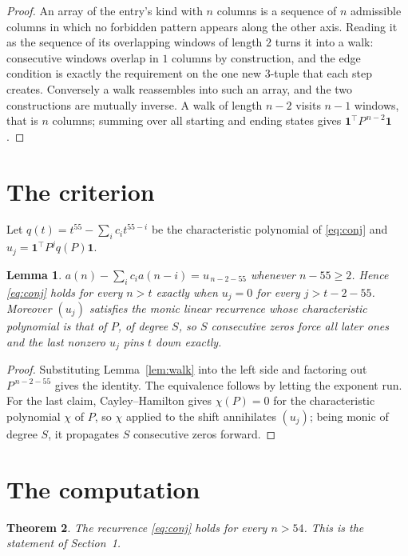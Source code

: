 \documentclass[11pt,a4paper]{article}
\theoremstyle{plain}
\newtheorem{theorem}{Theorem}
\newtheorem{lemma}[theorem]{Lemma}
\theoremstyle{definition}
\begin{document}
\begin{proof}
An array of the entry's kind with $n$ columns is a sequence of $n$ admissible columns in
which no forbidden pattern appears along the other axis. Reading it as the sequence of its
overlapping windows of length $2$ turns it into a walk: consecutive windows overlap in
$1$ columns by construction, and the edge condition is exactly the requirement on the one
new $3$-tuple that each step creates. Conversely a walk reassembles into such an array,
and the two constructions are mutually inverse. A walk of length $n-2$ visits $n-1$
windows, that is $n$ columns; summing over all starting and ending states gives
$\mathbf{1}^{\!\top}P^{\,n-2}\mathbf{1}$.
\end{proof}

\section{The criterion}

Let $q(t)=t^{55}-\sum_i c_i t^{55-i}$ be the characteristic polynomial of
\eqref{eq:conj} and $u_j=\mathbf{1}^{\!\top}P^{j}q(P)\mathbf{1}$.

\begin{lemma}\label{lem:crit}
$a(n)-\sum_i c_i a(n-i)=u_{\,n-2-55}$ whenever $n-55\ge2$. Hence
\eqref{eq:conj} holds for every $n>t$ exactly when $u_j=0$ for every
$j>t-2-55$. Moreover $(u_j)$ satisfies the monic linear recurrence whose
characteristic polynomial is that of $P$, of degree $S$, so $S$ consecutive zeros force all
later ones and the last nonzero $u_j$ pins $t$ down exactly.
\end{lemma}

\begin{proof}
Substituting Lemma~\ref{lem:walk} into the left side and factoring out
$P^{\,n-2-55}$ gives the identity. The equivalence follows by letting the exponent
run. For the last claim, Cayley--Hamilton gives $\chi(P)=0$ for the characteristic
polynomial $\chi$ of $P$, so $\chi$ applied to the shift annihilates $(u_j)$; being monic of
degree $S$, it propagates $S$ consecutive zeros forward.
\end{proof}

\section{The computation}

\begin{theorem}
The recurrence \eqref{eq:conj} holds for every $n>54$. This is the statement of
Section~1.
\end{theorem}
\end{document}
